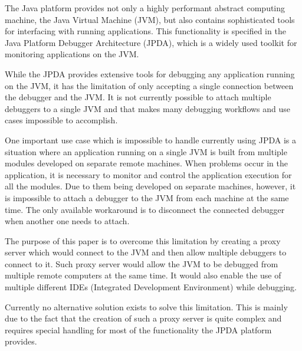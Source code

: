 \documentclass[..thesis.tex]{subfiles}
\begin{document}
% 
% 

The Java platform provides not only a highly performant abstract computing machine, the Java Virtual Machine (JVM), but also contains sophisticated tools for interfacing with running applications. 
This functionality is specified in the Java Platform Debugger Architecture (JPDA), which is a widely used toolkit for monitoring applications on the JVM.

While the JPDA provides extensive tools for debugging any application running on the JVM, it has the limitation of only accepting a single connection between the debugger and the JVM. 
It is not currently possible to attach multiple debuggers to a single JVM and that makes many debugging workflows and use cases impossible to accomplish.

One important use case which is impossible to handle currently using JPDA is a situation where an application running on a single JVM is built from multiple modules developed on separate remote machines.
When problems occur in the application, it is necessary to monitor and control the application execution for all the modules.
Due to them being developed on separate machines, however, it is impossible to attach a debugger to the JVM from each machine at the same time. 
The only available workaround is to disconnect the connected debugger when another one needs to attach.

The purpose of this paper is to overcome this limitation by creating a proxy server which would connect to the JVM and then allow multiple debuggers to connect to it. 
Such proxy server would allow the JVM to be debugged from multiple remote computers at the same time.  
It would also enable the use of multiple different IDEs (Integrated Development Environment) while debugging. 

Currently no alternative solution exists to solve this limitation.
This is mainly due to the fact that the creation of such a proxy server is quite complex and requires special handling for most of the functionality the JPDA platform provides.
\end{document}

